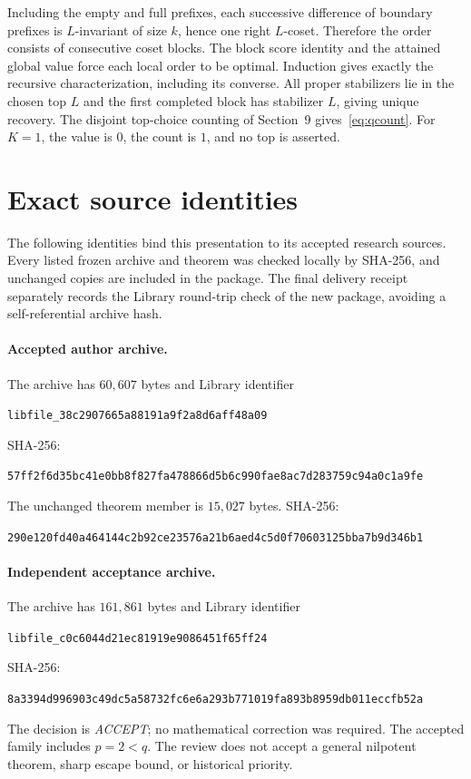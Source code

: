 \documentclass[11pt,letterpaper]{article}
\theoremstyle{definition}
\newcommand{\hash}[1]{{\small\ttfamily\nolinkurl{#1}}}
\begin{document}
Including the empty and full prefixes, each successive difference of boundary prefixes is $L$-invariant of size $k$, hence one right $L$-coset. Therefore the order consists of consecutive coset blocks. The block score identity and the attained global value force each local order to be optimal. Induction gives exactly the recursive characterization, including its converse. All proper stabilizers lie in the chosen top $L$ and the first completed block has stabilizer $L$, giving unique recovery. The disjoint top-choice counting of Section~9 gives~\eqref{eq:qcount}. For $K=1$, the value is $0$, the count is $1$, and no top is asserted.

\section{Exact source identities}\label{app:provenance}
The following identities bind this presentation to its accepted research sources. Every listed frozen archive and theorem was checked locally by SHA-256, and unchanged copies are included in the package. The final delivery receipt separately records the Library round-trip check of the new package, avoiding a self-referential archive hash.

\paragraph{Accepted author archive.}
The archive has $60{,}607$ bytes and Library identifier
\begin{center}\hash{libfile_38c2907665a88191a9f2a8d6aff48a09}\end{center} SHA-256:
\begin{center}\hash{57ff2f6d35bc41e0bb8f827fa478866d5b6c990fae8ac7d283759c94a0c1a9fe}\end{center}
The unchanged theorem member is $15{,}027$ bytes. SHA-256:
\begin{center}\hash{290e120fd40a464144c2b92ce23576a21b6aed4c5d0f70603125bba7b9d346b1}\end{center}

\paragraph{Independent acceptance archive.}
The archive has $161{,}861$ bytes and Library identifier
\begin{center}\hash{libfile_c0c6044d21ec81919e9086451f65ff24}\end{center} SHA-256:
\begin{center}\hash{8a3394d996903c49dc5a58732fc6e6a293b771019fa893b8959db011eccfb52a}\end{center}
The decision is \emph{ACCEPT}; no mathematical correction was required. The accepted family includes $p=2<q$. The review does not accept a general nilpotent theorem, sharp escape bound, or historical priority.
\end{document}
